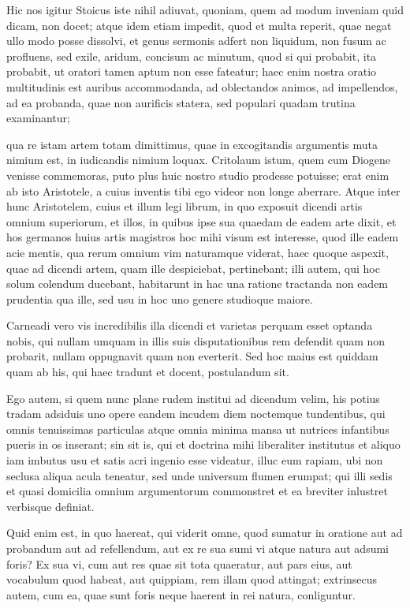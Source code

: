  Hic nos igitur Stoicus iste nihil adiuvat, quoniam, quem ad modum inveniam quid dicam, non docet; atque idem etiam impedit, quod et multa reperit, quae negat ullo modo posse dissolvi, et genus sermonis adfert non liquidum, non fusum ac profluens, sed exile, aridum, concisum ac minutum, quod si qui probabit, ita probabit, ut oratori tamen aptum non esse fateatur; haec enim nostra oratio multitudinis est auribus accommodanda, ad oblectandos animos, ad impellendos, ad ea probanda, quae non aurificis statera, sed populari quadam trutina examinantur;

 qua re istam artem totam dimittimus, quae in excogitandis argumentis muta nimium est, in iudicandis nimium loquax. Critolaum istum, quem cum Diogene venisse commemoras, puto plus huic nostro studio prodesse potuisse; erat enim ab isto Aristotele, a cuius inventis tibi ego videor non longe aberrare. Atque inter hunc Aristotelem, cuius et illum legi librum, in quo exposuit dicendi artis omnium superiorum, et illos, in quibus ipse sua quaedam de eadem arte dixit, et hos germanos huius artis magistros hoc mihi visum est interesse, quod ille eadem acie mentis, qua rerum omnium vim naturamque viderat, haec quoque aspexit, quae ad dicendi artem, quam ille despiciebat, pertinebant; illi autem, qui hoc solum colendum ducebant, habitarunt in hac una ratione tractanda non eadem prudentia qua ille, sed usu in hoc uno genere studioque maiore.

 Carneadi vero vis incredibilis illa dicendi et varietas perquam esset optanda nobis, qui nullam umquam in illis suis disputationibus rem defendit quam non probarit, nullam oppugnavit quam non everterit. Sed hoc maius est quiddam quam ab his, qui haec tradunt et docent, postulandum sit.

 Ego autem, si quem nunc plane rudem institui ad dicendum velim, his potius tradam adsiduis uno opere eandem incudem diem noctemque tundentibus, qui omnis tenuissimas particulas atque omnia minima mansa ut nutrices infantibus pueris in os inserant; sin sit is, qui et doctrina mihi liberaliter institutus et aliquo iam imbutus usu et satis acri ingenio esse videatur, illuc eum rapiam, ubi non seclusa aliqua acula teneatur, sed unde universum flumen erumpat; qui illi sedis et quasi domicilia omnium argumentorum commonstret et ea breviter inlustret verbisque definiat.

 Quid enim est, in quo haereat, qui viderit omne, quod sumatur in oratione aut ad probandum aut ad refellendum, aut ex re sua sumi vi atque natura aut adsumi foris? Ex sua vi, cum aut res quae sit tota quaeratur, aut pars eius, aut vocabulum quod habeat, aut quippiam, rem illam quod attingat; extrinsecus autem, cum ea, quae sunt foris neque haerent in rei natura, conliguntur.

